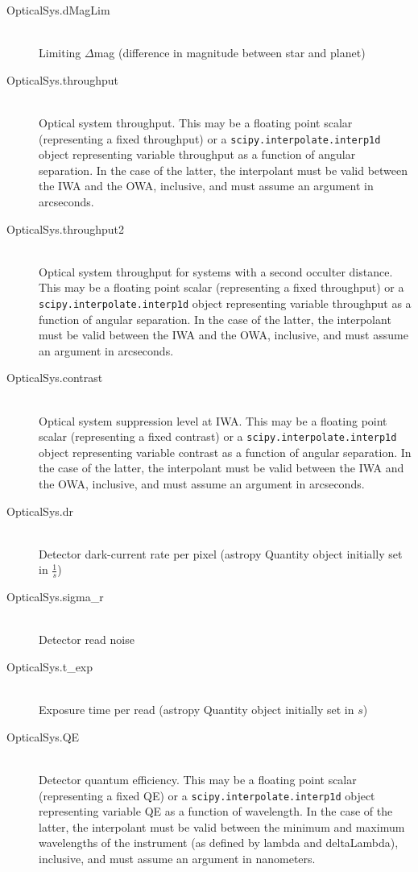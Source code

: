 \documentclass[cleanfoot]{asme2ej}
\begin{document}
\begin{itemize}
\begin{description}
        \item[OpticalSys.dMagLim] \hfill \\
        Limiting $ \Delta$mag (difference in magnitude between star and planet)
        \item[OpticalSys.throughput] \hfill \\
        Optical system throughput. This may be a floating point scalar (representing a fixed throughput) or a \verb+scipy.interpolate.interp1d+ object representing variable throughput as a function of angular separation.  In the case of the latter, the interpolant must be valid between the IWA and the OWA, inclusive, and must assume an argument in arcseconds.
        \item[OpticalSys.throughput2] \hfill \\
        Optical system throughput for systems with a second occulter distance. This may be a floating point scalar (representing a fixed throughput) or a \verb+scipy.interpolate.interp1d+ object representing variable throughput as a function of angular separation.  In the case of the latter, the interpolant must be valid between the IWA and the OWA, inclusive, and must assume an argument in arcseconds.
        \item[OpticalSys.contrast] \hfill \\
        Optical system suppression level at IWA. This may be a floating point scalar (representing a fixed contrast) or a \verb+scipy.interpolate.interp1d+ object representing variable contrast as a function of angular separation.  In the case of the latter, the interpolant must be valid between the IWA and the OWA, inclusive, and must assume an argument in arcseconds.
        \item[OpticalSys.dr] \hfill \\
        Detector dark-current rate per pixel (astropy Quantity object initially set in $ \frac{1}{s} $)
        \item[OpticalSys.sigma\_r] \hfill \\
        Detector read noise 
        \item[OpticalSys.t\_exp] \hfill \\
        Exposure time per read (astropy Quantity object initially set in $ s $)
        \item[OpticalSys.QE] \hfill \\
        Detector quantum efficiency. This may be a floating point scalar (representing a fixed QE) or a \verb+scipy.interpolate.interp1d+ object representing variable QE as a function of wavelength.  In the case of the latter, the interpolant must be valid between the minimum and maximum wavelengths of the instrument (as defined by lambda and deltaLambda), inclusive, and must assume an argument in nanometers.

\end{description}
\end{itemize}
\end{document}
